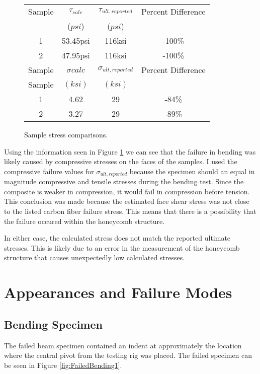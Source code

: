 \documentclass{article}
\begin{document}
\begin{figure}[H]
\begin{center}
  \begin{tabular}{|c|c|c|c|}
      \hline
      Sample & $\tau_{calc}$ & $\tau_{ult,reported}$ & Percent Difference \\
             & ($psi$) & ($psi$) & \\
      \hline
      1 & 53.45psi & 116ksi & -100\% \\
      2 & 47.95psi & 116ksi & -100\% \\
      \hline
      Sample & $\sigma{calc}$ & $\sigma_{ult,reported}$ & Percent Difference \\
      Sample & $(ksi)$ & $(ksi)$ & \\
      \hline
      1 & 4.62 & 29 & -84\% \\
      2 & 3.27 & 29 & -89\% \\
      \hline
  \end{tabular}
  \caption{Sample stress comparisons.}
  \label{tab:BendStressComparison}
\end{center}
\end{figure}

Using the information seen in Figure \ref{tab:BendStressComparison} we can see that the failure in bending was likely caused by compressive stresses on the faces of the samples. I used the compressive failure values for $\sigma_{ult,reported}$ because the specimen should an equal in magnitude compressive and tensile stresses during the bending test. Since the composite is weaker in compression, it would fail in compression before tension. This conclusion was made because the estimated face shear stress was not close to the listed carbon fiber failure stress. This means that there is a possibility that the failure occured within the honeycomb structure.

In either case, the calculated stress does not match the reported ultimate stresses. This is likely due to an error in the measurement of the honeycomb structure that causes unexpectedly low calculated stresses.

\section{Appearances and Failure Modes}
\subsection{Bending Specimen}
The failed beam specimen contained an indent at approximately the location where the central pivot from the testing rig was placed. The failed specimen can be seen in Figure \ref{fig:FailedBending1}.
\end{document}
